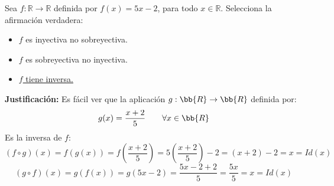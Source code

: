\documentclass[12pt]{article}
\newcounter{ejercicio}[section] %
\newcounter{ejercicio}
\begin{document}
    \begin{ejercicio}
        Sea $f:\mathbb{R} \rightarrow \mathbb{R}$ definida por $f(x) = 5x -2$, para todo $x \in \mathbb{R}$. Selecciona la afirmación verdadera:
        \begin{itemize}
            \item $f$ es inyectiva no sobreyectiva.
            \item $f$ es sobreyectiva no inyectiva.
            \item \underline{$f$ tiene inversa.}
        \end{itemize}
        \textbf{Justificación:}\newline
        Es fácil ver que la aplicación $g:\bb{R}\rightarrow \bb{R}$ definida por:
        $$g(x) = \dfrac{x+2}{5}~~~~~~\forall x \in \bb{R}$$
        Es la inversa de $f$:
        $$(f \circ g)(x) = f(g(x)) = f\left(\dfrac{x+2}{5}\right) = 5\left(\dfrac{x+2}{5}\right)-2 = (x+2)-2 = x = Id(x)$$
        $$(g \circ f)(x) = g(f(x)) = g(5x-2) = \dfrac{5x-2+2}{5} = \dfrac{5x}{5} = x = Id(x)$$
    \end{ejercicio}
\end{document}

